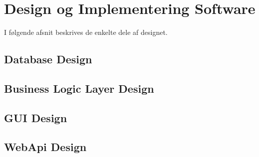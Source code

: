 \section{Design og Implementering Software}
I følgende afsnit beskrives de enkelte dele af designet.

\subsection{Database Design}


\subsection{Business Logic Layer Design}


\subsection{GUI Design}


\subsection{WebApi Design}
